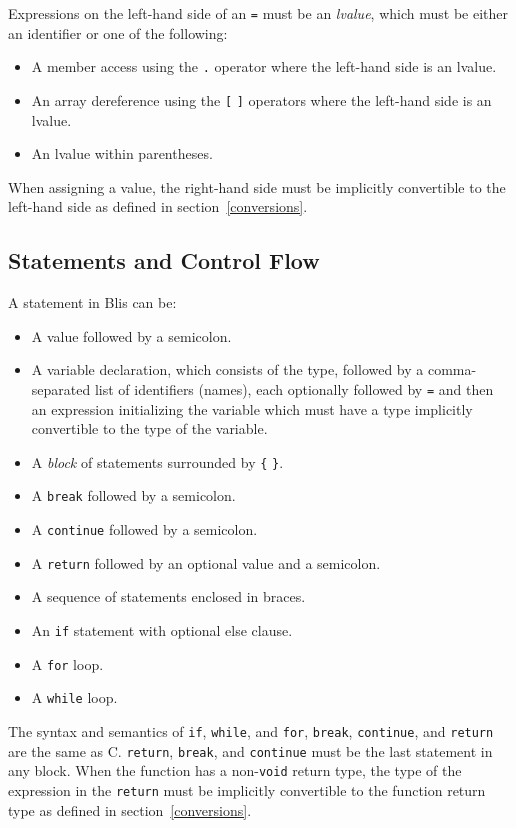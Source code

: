 \documentclass[11pt]{article}
\newcommand{\code}[1]{\texttt{#1}}
\begin{document}
Expressions on the left-hand side of an \code{=} must be an \textit{lvalue}, which must be either an identifier or one of the following:

\begin{itemize}
    \item A member access using the \code{.} operator where the left-hand side is an lvalue.
    \item An array dereference using the \code{[} \code{]} operators where the left-hand side is an lvalue.
    \item An lvalue within parentheses.
\end{itemize}

When assigning a value, the right-hand side must be implicitly convertible to the left-hand side as defined in section~\ref{conversions}.

\subsection{Statements and Control Flow}

A statement in Blis can be:

\begin{itemize}
    \item A value followed by a semicolon.
    \item A variable declaration, which consists of the type, followed by a comma-separated list of identifiers (names), each optionally followed by \code{=} and then an expression initializing the variable which must have a type implicitly convertible to the type of the variable.
    \item A \textit{block} of statements surrounded by \code{\{} \code{\}}.
    \item A \code{break} followed by a semicolon.
    \item A \code{continue} followed by a semicolon.
    \item A \code{return} followed by an optional value and a semicolon.
    \item A sequence of statements enclosed in braces.
    \item An \code{if} statement with optional else clause.
    \item A \code{for} loop.
    \item A \code{while} loop.
\end{itemize}

The syntax and semantics of \code{if}, \code{while}, and \code{for}, \code{break}, \code{continue}, and \code{return} are the same as C. \code{return}, \code{break}, and \code{continue} must be the last statement in any block. When the function has a non-\code{void} return type, the type of the expression in the \code{return} must be implicitly convertible to the function return type as defined in section~\ref{conversions}.
\end{document}
